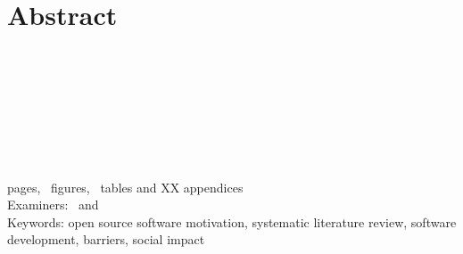\section*{Abstract}
\begin{spacing}{1.5}
    \university\\
    \school\\
    \degreeprogramme\\
\end{spacing}

\myname

\textbf{\mytitle}\\
\mysubtitle

\begin{spacing}{1.5}
    \thesistype\\
    \thesisyear\\
    \pageref{myLastPage} pages, \totalfigures~figures, \totaltables~tables and XX appendices\\
    Examiners: \examinerA~and \examinerB\\
    Keywords: open source software motivation, systematic literature review, software development, barriers, social impact
\end{spacing}

\vspace{1em}
\begin{spacing}{1.0}





\end{spacing}
\clearpage %
